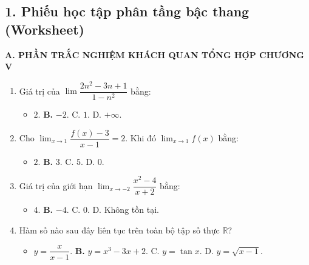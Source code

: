\documentclass[12pt, a4paper]{article}
\begin{document}
\subsection*{1. Phiếu học tập phân tầng bậc thang (Worksheet)}

\noindent \textbf{A. PHẦN TRẮC NGHIỆM KHÁCH QUAN TỔNG HỢP CHƯƠNG V}
\begin{enumerate}[leftmargin=0.6cm]
    \item Giá trị của $\lim \dfrac{2n^2 - 3n + 1}{1 - n^2}$ bằng:
    \begin{itemize}[leftmargin=0.6cm]
        \item[A.] $2$. \quad \textbf{B.} $-2$. \quad C. $1$. \quad D. $+\infty$.
    \end{itemize}
    \item Cho $\lim_{x \to 1} \dfrac{f(x) - 3}{x - 1} = 2$. Khi đó $\lim_{x \to 1} f(x)$ bằng:
    \begin{itemize}[leftmargin=0.6cm]
        \item[A.] $2$. \quad \textbf{B.} $3$. \quad C. $5$. \quad D. $0$.
    \end{itemize}
    \item Giá trị của giới hạn $\lim_{x \to -2} \dfrac{x^2 - 4}{x + 2}$ bằng:
    \begin{itemize}[leftmargin=0.6cm]
        \item[A.] $4$. \quad \textbf{B.} $-4$. \quad C. $0$. \quad D. Không tồn tại.
    \end{itemize}
    \item Hàm số nào sau đây liên tục trên toàn bộ tập số thực $\mathbb{R}$?
    \begin{itemize}[leftmargin=0.6cm]
        \item[A.] $y = \dfrac{x}{x - 1}$. \quad \textbf{B.} $y = x^3 - 3x + 2$. \quad C. $y = \tan x$. \quad D. $y = \sqrt{x - 1}$.
    \end{itemize}
\end{enumerate}
\end{document}
